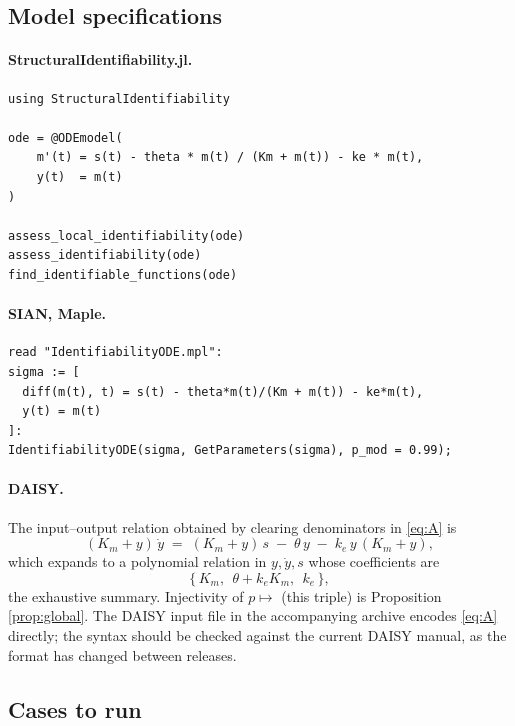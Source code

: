 \documentclass[11pt,a4paper]{article}
\begin{document}
\subsection{Model specifications}

\paragraph{StructuralIdentifiability.jl.}
\begin{lstlisting}
using StructuralIdentifiability

ode = @ODEmodel(
    m'(t) = s(t) - theta * m(t) / (Km + m(t)) - ke * m(t),
    y(t)  = m(t)
)

assess_local_identifiability(ode)
assess_identifiability(ode)
find_identifiable_functions(ode)
\end{lstlisting}

\paragraph{SIAN, Maple.}
\begin{lstlisting}
read "IdentifiabilityODE.mpl":
sigma := [
  diff(m(t), t) = s(t) - theta*m(t)/(Km + m(t)) - ke*m(t),
  y(t) = m(t)
]:
IdentifiabilityODE(sigma, GetParameters(sigma), p_mod = 0.99);
\end{lstlisting}

\paragraph{DAISY.} The input--output relation obtained by clearing denominators in
\eqref{eq:A} is
\begin{equation}
(K_m + y)\,\dot y \;=\; (K_m + y)\, s \;-\; \theta\, y \;-\; k_e\, y\,(K_m + y),
\label{eq:io}
\end{equation}
which expands to a polynomial relation in $y, \dot y, s$ whose coefficients are
\[
\{\, K_m,\ \ \theta + k_e K_m,\ \ k_e \,\},
\]
the exhaustive summary. Injectivity of $p \mapsto$ (this triple) is Proposition
\ref{prop:global}. The DAISY input file in the accompanying archive encodes
\eqref{eq:A} directly; the syntax should be checked against the current DAISY manual, as
the format has changed between releases.

\subsection{Cases to run}
\end{document}
